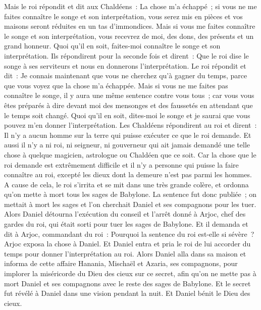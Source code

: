 \begin{multicols}{2}
Mais le roi répondit et dit aux Chaldéens~: La chose m'a échappé~; si vous ne me faites connaître le songe et son interprétation, vous serez mis en pièces et vos maisons seront réduites en un tas d'immondices.
Mais si vous me faites connaître le songe et son interprétation, vous recevrez de moi, des dons, des présents et un grand honneur. Quoi qu'il en soit, faites-moi connaître le songe et son interprétation.
Ils répondirent pour la seconde fois et dirent~: Que le roi dise le songe à ses serviteurs et nous en donnerons l'interprétation.
Le roi répondit et dit~: Je connais maintenant que vous ne cherchez qu'à gagner du temps, parce que vous voyez que la chose m'a échappée.
Mais si vous ne me faites pas connaître le songe, il y aura une même sentence contre vous tous~; car vous vous êtes préparés à dire devant moi des mensonges et des faussetés en attendant que le temps soit changé. Quoi qu'il en soit, dites-moi le songe et je saurai que vous pouvez m'en donner l'interprétation.
Les Chaldéens répondirent au roi et dirent~: Il n'y a aucun homme sur la terre qui puisse exécuter ce que le roi demande. Et aussi il n'y a ni roi, ni seigneur, ni gouverneur qui ait jamais demandé une telle chose à quelque magicien, astrologue ou Chaldéen que ce soit.
Car la chose que le roi demande est extrêmement difficile et il n'y a personne qui puisse la faire connaître au roi, excepté les dieux dont la demeure n'est pas parmi les hommes.
A cause de cela, le roi s'irrita et se mit dans une très grande colère, et ordonna qu'on mette à mort tous les sages de Babylone.
La sentence fut donc publiée~; on mettait à mort les sages et l'on cherchait Daniel et ses compagnons pour les tuer.
Alors Daniel détourna l'exécution du conseil et l'arrêt donné à Arjoc, chef des gardes du roi, qui était sorti pour tuer les sages de Babylone.
Et il demanda et dit à Arjoc, commandant du roi~: Pourquoi la sentence du roi est-elle si sévère~? Arjoc exposa la chose à Daniel.
Et Daniel entra et pria le roi de lui accorder du temps pour donner l'interprétation au roi.
Alors Daniel alla dans sa maison et informa de cette affaire Hanania, Mischaël et Azaria, ses compagnons,
pour implorer la miséricorde du Dieu des cieux sur ce secret, afin qu'on ne mette pas à mort Daniel et ses compagnons avec le reste des sages de Babylone.
Et le secret fut révélé à Daniel dans une vision pendant la nuit. Et Daniel bénit le Dieu des cieux.

\end{multicols}
